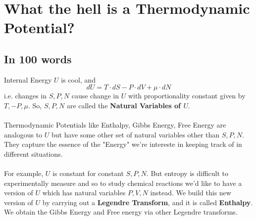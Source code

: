 \documentclass[11pt]{article}
\begin{document}
\section{What the hell is a Thermodynamic Potential?}

\subsection{In 100 words}

\begin{bluebox}
  Internal Energy $U$ is cool, and $$ dU = T \cdot dS -P \cdot dV + \mu \cdot dN $$ i.e. changes in $S, P, N$ cause change in $U$ with proportionality constant given by $T, -P, \mu$. So, $S, P, N$ are called the \textbf{Natural Variables of $U$}.
  \\
  \\
  Thermodynamic Potentials like Enthalpy, Gibbs Energy, Free Energy are analogous to $U$ but have some other set of  natural variables other than $S, P, N$. They capture the essence of the "Energy" we're intereste in keeping track of in different situations. 
  \\
  \\
  For example, $U$ is constant for constant $S, P, N$. But entropy is difficult to experimentally measure and so to study chemical reactions we'd like to have a version of $U$ which has natural variables $P, V, N$ instead. We build this new version of $U$ by carrying out a \textbf{Legendre Transform}, and it is called \textbf{Enthalpy}. We obtain the Gibbs Energy and Free energy via other Legendre transforms.
\end{bluebox}
\end{document}

